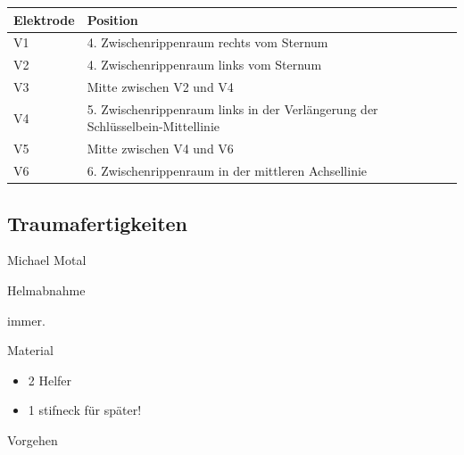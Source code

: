 \documentclass{article}
\begin{document}
\begin{center}
\begin{tabular}{|m{6.649cm}|m{6.651cm}}
\hline
\centering Elektrode\par

 &
\centering Position\par

\\\hline
V1

 &
4. Zwischenrippenraum rechts vom Sternum

\\\hline
V2

 &
4. Zwischenrippenraum links vom Sternum

\\\hline
V3

 &
Mitte zwischen V2 und V4

\\\hline
V4

 &
5. Zwischenrippenraum links in der Verl\"angerung der
Schl\"usselbein-Mittellinie

\\\hline
V5

 &
Mitte zwischen V4 und V6

\\\hline
V6

 &
6. Zwischenrippenraum in der mittleren Achsellinie

\\\hline
\end{tabular}
\end{center}
\subsection{Traumafertigkeiten}
Michael Motal

Helmabnahme

immer.

Material

\begin{itemize}
\item 2 Helfer

\item 1 stifneck f\"ur sp\"ater!

\end{itemize}
Vorgehen
\end{document}
